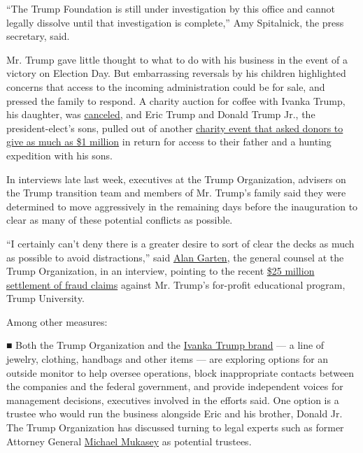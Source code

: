 ``The Trump Foundation is still under investigation by this office and
cannot legally dissolve until that investigation is complete,'' Amy
Spitalnick, the press secretary, said.

Mr. Trump gave little thought to what to do with his business in the
event of a victory on Election Day. But embarrassing reversals by his
children highlighted concerns that access to the incoming administration
could be for sale, and pressed the family to respond. A charity auction
for coffee with Ivanka Trump, his daughter, was
\href{http://www.nytimes.com/2016/12/16/us/politics/ivanka-trump-charity-auction.html}{canceled},
and Eric Trump and Donald Trump Jr., the president-elect's sons, pulled
out of another
\href{http://tmz.vo.llnwd.net/o28/newsdesk/tmz_documents/Opening_Day_2017_Redacted.pdf}{charity
event that asked donors to give as much as \$1 million} in return for
access to their father and a hunting expedition with his sons.

In interviews late last week, executives at the Trump Organization,
advisers on the Trump transition team and members of Mr. Trump's family
said they were determined to move aggressively in the remaining days
before the inauguration to clear as many of these potential conflicts as
possible.

``I certainly can't deny there is a greater desire to sort of clear the
decks as much as possible to avoid distractions,'' said
\href{https://www.linkedin.com/in/alan-garten-405a1013}{Alan Garten},
the general counsel at the Trump Organization, in an interview, pointing
to the recent
\href{http://www.nytimes.com/2016/11/19/us/politics/trump-university.html}{\$25
million settlement of fraud claims} against Mr. Trump's for-profit
educational program, Trump University.

Among other measures:

■ Both the Trump Organization and the
\href{http://ivankatrump.com/}{Ivanka Trump brand} --- a line of
jewelry, clothing, handbags and other items --- are exploring options
for an outside monitor to help oversee operations, block inappropriate
contacts between the companies and the federal government, and provide
independent voices for management decisions, executives involved in the
efforts said. One option is a trustee who would run the business
alongside Eric and his brother, Donald Jr. The Trump Organization has
discussed turning to legal experts such as former Attorney General
\href{http://www.debevoise.com/michaelmukasey}{Michael Mukasey} as
potential trustees.

